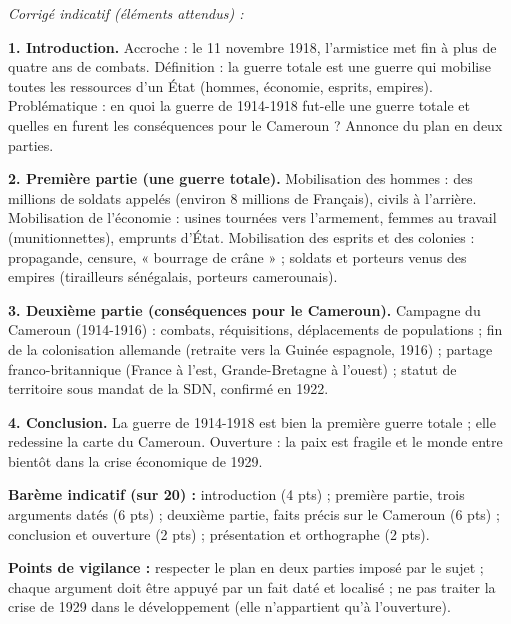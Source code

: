 \documentclass[11pt]{article}
\begin{document}
\begin{corrige}
\emph{Corrigé indicatif (éléments attendus) :}

\textbf{1. Introduction.} Accroche : le 11 novembre 1918, l'armistice met fin à plus de quatre ans de combats. Définition : la guerre totale est une guerre qui mobilise toutes les ressources d'un État (hommes, économie, esprits, empires). Problématique : en quoi la guerre de 1914-1918 fut-elle une guerre totale et quelles en furent les conséquences pour le Cameroun ? Annonce du plan en deux parties.

\textbf{2. Première partie (une guerre totale).} Mobilisation des hommes : des millions de soldats appelés (environ 8 millions de Français), civils à l'arrière. Mobilisation de l'économie : usines tournées vers l'armement, femmes au travail (munitionnettes), emprunts d'État. Mobilisation des esprits et des colonies : propagande, censure, « bourrage de crâne » ; soldats et porteurs venus des empires (tirailleurs sénégalais, porteurs camerounais).

\textbf{3. Deuxième partie (conséquences pour le Cameroun).} Campagne du Cameroun (1914-1916) : combats, réquisitions, déplacements de populations ; fin de la colonisation allemande (retraite vers la Guinée espagnole, 1916) ; partage franco-britannique (France à l'est, Grande-Bretagne à l'ouest) ; statut de territoire sous mandat de la SDN, confirmé en 1922.

\textbf{4. Conclusion.} La guerre de 1914-1918 est bien la première guerre totale ; elle redessine la carte du Cameroun. Ouverture : la paix est fragile et le monde entre bientôt dans la crise économique de 1929.

\textbf{Barème indicatif (sur 20) :} introduction (4 pts) ; première partie, trois arguments datés (6 pts) ; deuxième partie, faits précis sur le Cameroun (6 pts) ; conclusion et ouverture (2 pts) ; présentation et orthographe (2 pts).

\textbf{Points de vigilance :} respecter le plan en deux parties imposé par le sujet ; chaque argument doit être appuyé par un fait daté et localisé ; ne pas traiter la crise de 1929 dans le développement (elle n'appartient qu'à l'ouverture).
\end{corrige}
\end{document}
